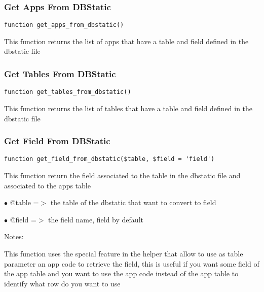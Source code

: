 \documentclass[a4paper]{article}
\begin{document}
\hypertarget{toc424}{}
\subsubsection{Get Apps From DBStatic}

\begin{lstlisting}
function get_apps_from_dbstatic()
\end{lstlisting}

This function returns the list of apps that have a table and field defined
in the dbstatic file

\hypertarget{toc425}{}
\subsubsection{Get Tables From DBStatic}

\begin{lstlisting}
function get_tables_from_dbstatic()
\end{lstlisting}

This function returns the list of tables that have a table and field defined
in the dbstatic file

\hypertarget{toc426}{}
\subsubsection{Get Field From DBStatic}

\begin{lstlisting}
function get_field_from_dbstatic($table, $field = 'field')
\end{lstlisting}

This function return the field associated to the table in the dbstatic
file and associated to the apps table

\begin{compactitem}
\item[\color{myblue}$\bullet$] @table =$>$ the table of the dbstatic that want to convert to field
\item[\color{myblue}$\bullet$] @field =$>$ the field name, field by default
\end{compactitem}

Notes:

This function uses the special feature in the helper that allow to
use as table parameter an app code to retrieve the field, this is
useful if you want some field of the app table and you want to use
the app code instead of the app table to identify what row do you
want to use

\hypertarget{toc427}{}
\end{document}
